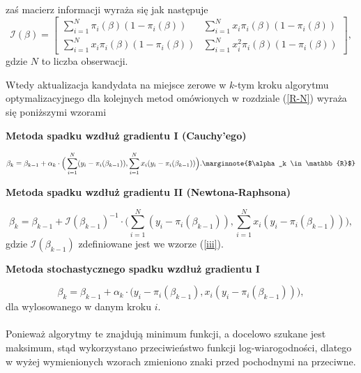 zaś macierz informacji wyraża się jak następuje
\begin{equation}\label{iii}
\mathscr{I}(\beta) = 
\begin{bmatrix}
    \sum\limits_{i=1}^{N}\pi_i(\beta)(1-\pi_i(\beta))       & \sum\limits_{i=1}^{N}x_i\pi_i(\beta)(1-\pi_i(\beta)) \\
\sum\limits_{i=1}^{N}x_i\pi_i(\beta)(1-\pi_i(\beta)) & \sum\limits_{i=1}^{N}x_i^2\pi_i(\beta)(1-\pi_i(\beta)) 
\end{bmatrix},
\end{equation}
gdzie $N$ to liczba obserwacji.

Wtedy aktualizacja kandydata na miejsce zerowe w $k$-tym kroku algorytmu optymalizacyjnego dla kolejnych metod omówionych w rozdziale (\ref{R-N}) wyraża się poniższymi wzorami
\\
\begin{center}
\textbf{Metoda spadku wzdłuż gradientu I (Cauchy’ego)}
\end{center}
\begin{equation*}
\beta_{k} = \beta_{k-1} + \alpha_{k}\cdot\Big(\sum\limits_{i=1}^{N}(y_i-\pi_i(\beta_{k-1})), \sum\limits_{i=1}^{N}x_i(y_i-\pi_i(\beta_{k-1}))\Big).\marginnote{$\alpha_k \in \mathbb{R}$}
\end{equation*}
\begin{center}
\textbf{Metoda spadku wzdłuż gradientu II (Newtona-Raphsona)}
\end{center}
\begin{equation*}
\beta_{k} = \beta_{k-1} + \mathscr{I}(\beta_{k-1})^{-1}\cdot\Big(\sum\limits_{i=1}^{N}(y_i-\pi_i(\beta_{k-1})), \sum\limits_{i=1}^{N}x_i(y_i-\pi_i(\beta_{k-1}))\Big),
\end{equation*}
gdzie $\mathscr{I}(\beta_{k-1})$ zdefiniowane jest we wzorze (\ref{iii}). 
\begin{center}
\textbf{Metoda stochastycznego spadku wzdłuż gradientu I}
\end{center}
\begin{equation*}
\beta_{k} = \beta_{k-1} + \alpha_{k}\cdot\Big(y_i-\pi_i(\beta_{k-1}), x_i(y_i-\pi_i(\beta_{k-1}))\Big),
\end{equation*}
dla wylosowanego w danym kroku $i$.
\\ \ \\
Ponieważ algorytmy te znajdują minimum funkcji, a docelowo szukane jest maksimum, stąd wykorzystano przeciwieństwo funkcji log-wiarogodności, dlatego w wyżej wymienionych wzorach zmieniono znaki przed pochodnymi na przeciwne.

